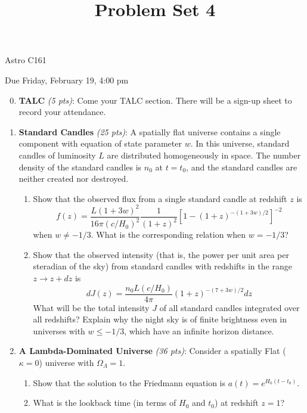 \documentclass[12pt,preprint]{aastex}
\title{Problem Set 4}
\begin{document}
\maketitle
\centerline{Astro C161} 

\centerline{Due Friday, February 19, 4:00 pm}

\begin{enumerate}
\setcounter{enumi}{-1}

\item \textbf{TALC} \textit{(5 pts)}: Come your TALC section. There will be a sign-up sheet to record your attendance.

\item \textbf{Standard Candles} \textit{(25 pts)}: A spatially flat universe contains a single component with equation of state parameter $w$. In this universe, standard candles of luminosity $L$ are distributed homogeneously in space. The number density of the standard candles is $n_0$ at $t=t_0$, and the standard candles are neither created nor destroyed. 
\begin{enumerate}
	\item Show that the observed flux from a single standard candle at redshift $z$ is 
	$$f(z) = \frac{L(1+3w)^2}{16\pi(c/H_0)^2} \frac{1}{(1+z)^2} \left [1-(1+z)^{-(1+3w)/2} \right ]^{-2}$$
	when $w \ne -1/3$. What is the corresponding relation when $w = -1/3$?
	
	\item Show that the observed intensity (that is, the power per unit area per steradian of the sky) from standard candles with redshifts in the range $z \rightarrow z+dz$ is
	$$dJ(z) = \frac{n_0 L(c/H_0)}{4 \pi} (1+z)^{-(7+3w)/2} dz$$
	What will be the total intensity $J$ of all standard candles integrated over all redshifts? Explain why the night sky is of finite brightness even in universes with $w \leq -1/3$, which have an infinite horizon distance. 
\end{enumerate}

\item \textbf{A Lambda-Dominated Universe} \textit{(36 pts)}: Consider a spatially Flat ($\kappa = 0$) universe with $\Omega_{\Lambda} = 1$. 
\begin{enumerate}
	\item Show that the solution to the Friedmann equation is $a(t) = e^{H_0(t-t_0)} $.
	
	\item What is the lookback time (in terms of $H_0$ and $t_0$) at redshift $z = 1$?
	

\end{enumerate}
\end{enumerate}
\end{document}
